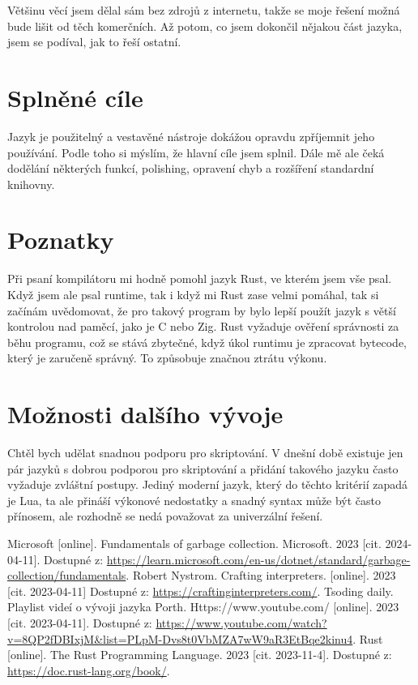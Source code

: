 \documentclass[12pt, a4paper,
twoside,        %
openright
]{report}
\renewcommand\bibname{Seznam použitých zdrojů}
\begin{document}
	Většinu věcí jsem dělal sám bez zdrojů z internetu, takže se moje řešení možná bude lišit od těch komerčních. Až potom, co jsem dokončil nějakou část jazyka, jsem se podíval, jak to řeší ostatní.
	
	\section*{Splněné cíle}
	
	Jazyk je použitelný a vestavěné nástroje dokážou opravdu zpříjemnit jeho používání. Podle toho si mýslím, že hlavní cíle jsem splnil. Dále mě ale čeká dodělání některých funkcí, polishing, opravení chyb a rozšíření standardní knihovny.
	
	\section*{Poznatky}
	
	Při psaní kompilátoru mi hodně pomohl jazyk Rust, ve kterém jsem vše psal. Když jsem ale psal runtime, tak i když mi Rust zase velmi pomáhal, tak si začínám uvědomovat, že pro takový program by bylo lepší použít jazyk s větší kontrolou nad paměcí, jako je C nebo Zig. Rust vyžaduje ověření správnosti za běhu programu, což se stává zbytečné, když úkol runtimu je zpracovat bytecode, který je zaručeně správný. To způsobuje značnou ztrátu výkonu.
	
	\section*{Možnosti dalšího vývoje}
	
	Chtěl bych udělat snadnou podporu pro skriptování. V dnešní době existuje jen pár jazyků s dobrou podporou pro skriptování a přidání takového jazyku často vyžaduje zvláštní postupy. Jediný moderní jazyk, který do těchto kritérií zapadá je Lua, ta ale přináší výkonové nedostatky a snadný syntax může být často přínosem, ale rozhodně se nedá považovat za univerzální řešení.
	
	
	\renewcommand\bibname{Použité zdroje informací}
	\begin{thebibliography}{99}
		
		 Microsoft [online]. Fundamentals of garbage collection. Microsoft. 2023 [cit. 2024-04-11]. Dostupné z: \url{https://learn.microsoft.com/en-us/dotnet/standard/garbage-collection/fundamentals}.
		 Robert Nystrom. Crafting interpreters. [online]. 2023 [cit. 2023-04-11] Dostupné z: \url{https://craftinginterpreters.com/}.
		 Tsoding daily. Playlist videí o vývoji jazyka Porth. Https://www.youtube.com/ [online]. 2023 [cit. 2023-04-11]. Dostupné z: \url{https://www.youtube.com/watch?v=8QP2fDBIxjM&list=PLpM-Dvs8t0VbMZA7wW9aR3EtBqe2kinu4}.
		 Rust [online]. The Rust Programming Language. 2023 [cit. 2023-11-4].  Dostupné z: \url{https://doc.rust-lang.org/book/}.
		
		
	\end{thebibliography}
	
\end{document}
